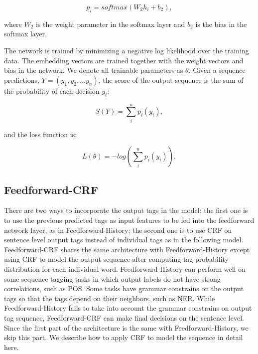 \begin{equation}
p_{i}=\textit{softmax}\left(W_{2}h_{i}+b_{2}\right),
\end{equation}

where $W_{2}$ is the weight parameter in the softmax layer and $b_{2}$ is the bias in the softmax layer.

The network is trained by minimizing a negative log likelihood over the training data. The embedding vectors are trained together with the weight vectors and bias in the network. We denote all trainable parameters as $\theta$. Given a sequence predictions, $Y=\left( y_{1},y_{2},\ldots y_{n}\right)$,
the score of the output sequence is the sum of the probability of each decision $y_{i}$: 

\begin{equation}
S\left( Y\right) = \sum _{i}^{n}p_{i}\left(y_{i}\right),
\end{equation}

and the loss function is:

\begin{equation}
L\left(\theta\right) = -log\left(\sum _{i}^{n}p_{i}\left(y_{i}\right)\right),
\end{equation}


\subsection{Feedforward-CRF}
\label{Feedforward-CRF}
There are two ways to incorporate the output tags in the model: the first one is to use the previous predicted tags as input features to be fed into the feedforward network layer, as in Feedforward-History; the second one is to use CRF on sentence level output tags instead of individual tags as in the following model. Feedforward-CRF shares the same architecture with Feedforward-History except using CRF to model the output sequence after computing tag probability distribution for each individual word. Feedforward-History can perform well on some sequence tagging tasks in which output labels do not have strong correlations, such as POS. Some tasks have grammar constrains on the output tags so that the tags depend on their neighbors, such as NER. While Feedforward-History fails to take into account the grammar constrains on output tag sequence, Feedforward-CRF can make final decisions on the sentence level. Since the first part of the architecture is the same with Feedforward-History, we skip this part. We describe how to apply CRF to model the sequence in detail here.

